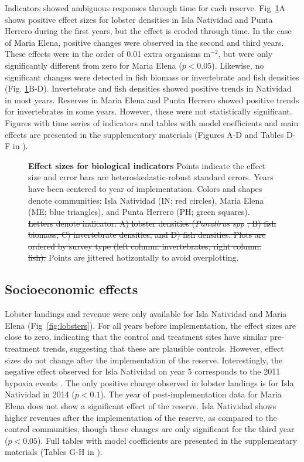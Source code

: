 \documentclass[10pt,letterpaper]{article}
\providecommand{\DIFdeltex}[1]{{\protect\color{red}\sout{#1}}}                      %
\providecommand{\DIFdelFL}[1]{\DIFdel{#1}} %
\providecommand{\DIFdelbeginFL}{} %
\providecommand{\DIFdelendFL}{} %
\providecommand{\DIFdel}[1]{\texorpdfstring{\DIFdeltex{#1}}{}} %
\newcommand{\DIFscaledelfig}{0.5}
\newlength{\DIFdelgraphicswidth} %
\newlength{\DIFdelgraphicsheight} %
\newcommand{\DIFdelincludegraphics}[2][]{%
\sbox{\DIFdelgraphicsbox}{\DIFOincludegraphics[#1]{#2}}%
\settoboxwidth{\DIFdelgraphicswidth}{\DIFdelgraphicsbox} %
\settoboxtotalheight{\DIFdelgraphicsheight}{\DIFdelgraphicsbox} %
\scalebox{\DIFscaledelfig}{%
\parbox[b]{\DIFdelgraphicswidth}{\usebox{\DIFdelgraphicsbox}\\[-\baselineskip] \rule{\DIFdelgraphicswidth}{0em}}\llap{\resizebox{\DIFdelgraphicswidth}{\DIFdelgraphicsheight}{%
\setlength{\unitlength}{\DIFdelgraphicswidth}%
\begin{picture}(1,1)%
\thicklines\linethickness{2pt} %
{\color[rgb]{1,0,0}\put(0,0){\framebox(1,1){}}}%
{\color[rgb]{1,0,0}\put(0,0){\line( 1,1){1}}}%
{\color[rgb]{1,0,0}\put(0,1){\line(1,-1){1}}}%
\end{picture}%
}\hspace*{3pt}}} %
} %
\DeclareRobustCommand{\DIFdelbeginFL}{\DIFOdelbeginFL \let\includegraphics\DIFdelincludegraphics} %
\DeclareRobustCommand{\DIFdelendFL}{\DIFOaddendFL \let\includegraphics\DIFOincludegraphics} %
\begin{document}
Indicators showed ambiguous responses through time for each reserve. Fig~\ref{fig:indicators}A shows positive effect sizes for lobster densities in Isla Natividad and Punta Herrero during the first years, but the effect is eroded through time. In the case of Maria Elena, positive changes were observed in the second and third years. These effects were in the order of 0.01 extra organisms $\mathrm{m}^{-2}$, but were only significantly different from zero for Maria Elena ($p < 0.05$). Likewise, no significant changes were detected in fish biomass or invertebrate and fish densities (Fig. \ref{fig:indicators}B-D). Invertebrate and fish densities showed positive trends in Natividad in most years. Reserves in Maria Elena and Punta Herrero showed positive trends for invertebrates in some years. However, these were not statistically significant. Figures with time series of indicators and tables with model coefficients and main effects are presented in the supplementary materials (Figures A-D and Tables D-F in ).

\begin{figure}[h]
\centering
\caption{{\bf Effect sizes for biological indicators}
Points indicate the effect size and error bars are heteroskedastic-robust standard errors. Years have been centered to year of implementation. Colors and shapes denote communities: Isla Natividad (IN; red circles), Maria Elena (ME; blue triangles), and Punta Herrero (PH; green squares). \DIFdelbeginFL \DIFdelFL{Letters denote indicator: A) lobster densities (}\emph{\DIFdelFL{Panulirus spp}}%
\DIFdelFL{, B) fish biomass, C) invertebrate densities, and D) fish densities. Plots are ordered by survey type (left column: invertebrates; right column: fish). }\DIFdelendFL Points are jittered hotizontally to avoid overplotting.}
\label{fig:indicators}
\end{figure}

\subsection*{Socioeconomic effects}

Lobster landings and revenue were only available for Isla Natividad and Maria Elena (Fig~\ref{fig:lobsters}). For all years before implementation, the effect sizes are close to zero, indicating that the control and treatment sites have similar pre-treatment trends, suggesting that these are plausible controls. However, effect sizes do not change after the implementation of the reserve. Interestingly, the negative effect observed for Isla Natividad on year 5 corresponds to the 2011 hypoxia events \cite{micheli_2012-EU}. The only positive change observed in lobster landings is for Isla Natividad in 2014 ($p < 0.1$). The year of post-implementation data for Maria Elena does not show a significant effect of the reserve. Isla Natividad shows higher revenues after the implementation of the reserve, as compared to the control communities, though these changes are only significant for the third year ($p < 0.05$). Full tables with model coefficients are presented in the supplementary materials (Tables G-H in ).
\end{document}
